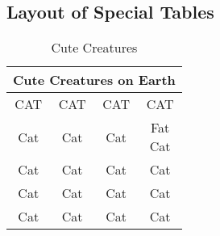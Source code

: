 \subsection{Layout of Special Tables}
\begin{table}[H]
    \begin{center}
    \caption{Cute Creatures}\label{table:11}
    \resizebox{\textwidth}{!}
    {\begin{tabular}{c c c c}
    \toprule[2pt]
    \multicolumn{4}{c}{Cute Creatures on Earth}\\
    \midrule %
    \multicolumn{1}{m{4cm}}{\centering CAT} %
    &\multicolumn{1}{m{4cm}}{\centering CAT}
    &\multicolumn{1}{m{4cm}}{\centering CAT}
    &\multicolumn{1}{m{4cm}}{\centering CAT}\\
    Cat&Cat&Cat& \makecell[c]{Fat\\Cat} \\
    Cat&Cat&Cat& Cat\\
    Cat&Cat&Cat& Cat\\
    Cat&Cat&Cat& Cat\\
    \bottomrule[2pt]
    \end{tabular}}
    \end{center}
\end{table}
\vspace{-0.5cm}

